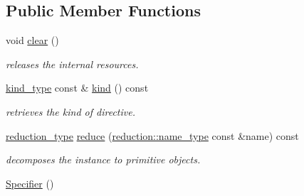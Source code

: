 \subsection*{Public Member Functions}
\begin{DoxyCompactItemize}
\item 
\hypertarget{classhryky_1_1http_1_1header_1_1cache_1_1directive_1_1_specifier_ac1c97a72866d0329957233f875bf8b3f}{void \hyperlink{classhryky_1_1http_1_1header_1_1cache_1_1directive_1_1_specifier_ac1c97a72866d0329957233f875bf8b3f}{clear} ()}\label{classhryky_1_1http_1_1header_1_1cache_1_1directive_1_1_specifier_ac1c97a72866d0329957233f875bf8b3f}

\begin{DoxyCompactList}\small\item\em releases the internal resources. \end{DoxyCompactList}\item 
\hypertarget{classhryky_1_1http_1_1header_1_1cache_1_1directive_1_1_specifier_a818e55a52b78d9e98cbcaea9d20f8fd3}{\hyperlink{classhryky_1_1_kind}{kind\-\_\-type} const \& \hyperlink{classhryky_1_1http_1_1header_1_1cache_1_1directive_1_1_specifier_a818e55a52b78d9e98cbcaea9d20f8fd3}{kind} () const }\label{classhryky_1_1http_1_1header_1_1cache_1_1directive_1_1_specifier_a818e55a52b78d9e98cbcaea9d20f8fd3}

\begin{DoxyCompactList}\small\item\em retrieves the kind of directive. \end{DoxyCompactList}\item 
\hypertarget{classhryky_1_1http_1_1header_1_1cache_1_1directive_1_1_specifier_a04aa52c7f7a6e9acde36e481c47d5aa1}{\hyperlink{namespacehryky_a343a9a4c36a586be5c2693156200eadc}{reduction\-\_\-type} \hyperlink{classhryky_1_1http_1_1header_1_1cache_1_1directive_1_1_specifier_a04aa52c7f7a6e9acde36e481c47d5aa1}{reduce} (\hyperlink{namespacehryky_1_1reduction_ac686c30a4c8d196bbd0f05629a6b921f}{reduction\-::name\-\_\-type} const \&name) const }\label{classhryky_1_1http_1_1header_1_1cache_1_1directive_1_1_specifier_a04aa52c7f7a6e9acde36e481c47d5aa1}

\begin{DoxyCompactList}\small\item\em decomposes the instance to primitive objects. \end{DoxyCompactList}\item 
\hypertarget{classhryky_1_1http_1_1header_1_1cache_1_1directive_1_1_specifier_a9314ff1e2ab71d3dae3219a82fbef8ec}{\hyperlink{classhryky_1_1http_1_1header_1_1cache_1_1directive_1_1_specifier_a9314ff1e2ab71d3dae3219a82fbef8ec}{Specifier} ()}\label{classhryky_1_1http_1_1header_1_1cache_1_1directive_1_1_specifier_a9314ff1e2ab71d3dae3219a82fbef8ec}


\end{DoxyCompactItemize}
